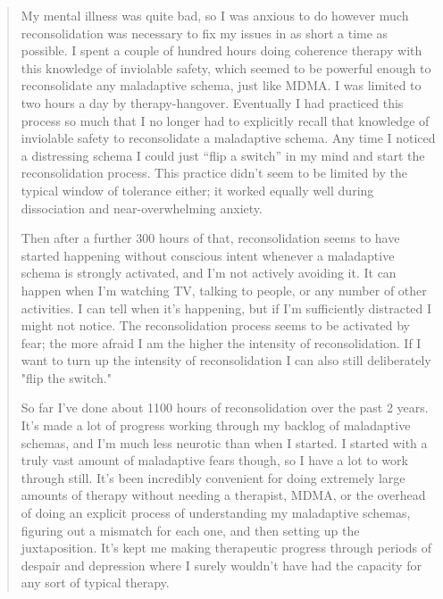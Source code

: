 \documentclass[12pt,letterpaper]{book}
\begin{document}
\begin{quotation}
    My mental illness was quite bad, so I was anxious to do however much reconsolidation was necessary to fix my issues in as short a time as possible. I spent a couple of hundred hours doing coherence therapy with this knowledge of inviolable safety, which seemed to be powerful enough to reconsolidate any maladaptive schema, just like MDMA. I was limited to two hours a day by therapy-hangover. Eventually I had practiced this process so much that I no longer had to explicitly recall that knowledge of inviolable safety to reconsolidate a maladaptive schema. Any time I noticed a distressing schema I could just “flip a switch” in my mind and start the reconsolidation process. This practice didn't seem to be limited by the typical window of tolerance either; it worked equally well during dissociation and near-overwhelming anxiety.

    Then after a further 300 hours of that, reconsolidation seems to have started happening without conscious intent whenever a maladaptive schema is strongly activated, and I'm not actively avoiding it. It can happen when I'm watching TV, talking to people, or any number of other activities. I can tell when it's happening, but if I'm sufficiently distracted I might not notice. The reconsolidation process seems to be activated by fear; the more afraid I am the higher the intensity of reconsolidation. If I want to turn up the intensity of reconsolidation I can also still deliberately "flip the switch."

    So far I've done about 1100 hours of reconsolidation over the past 2 years. It's made a lot of progress working through my backlog of maladaptive schemas, and I'm much less neurotic than when I started. I started with a truly vast amount of maladaptive fears though, so I have a lot to work through still. It's been incredibly convenient for doing extremely large amounts of therapy without needing a therapist, MDMA, or the overhead of doing an explicit process of understanding my maladaptive schemas, figuring out a mismatch for each one, and then setting up the juxtaposition. It's kept me making therapeutic progress through periods of despair and depression where I surely wouldn't have had the capacity for any sort of typical therapy.


\end{quotation}
\end{document}
